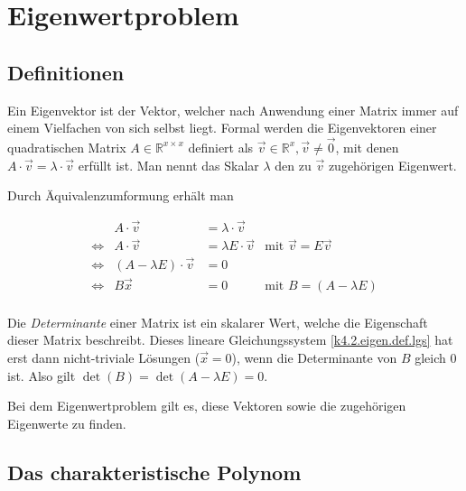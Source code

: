 \documentclass[]{dsadokumentation}
\begin{document}

\section{Eigenwertproblem}

\subsection{Definitionen}\label{k4.2.eigen.def}

Ein Eigenvektor ist der Vektor, welcher nach Anwendung einer Matrix immer auf einem Vielfachen von sich selbst liegt.
Formal werden die Eigenvektoren einer quadratischen Matrix $A \in \mathbb{R}^{x \times x}$ definiert als $\vec{v} \in \mathbb{R}^{x}, \vec{v} \neq \vec{0}$, mit denen $A \cdot \vec{v} = \lambda \cdot \vec{v}$ erfüllt ist. Man nennt das Skalar $\lambda$ den zu $\vec{v}$ zugehörigen Eigenwert.

Durch Äquivalenzumformung erhält man

\begin{equation}
  \label{k4.2.eigen.def.lgs}
  \begin{aligned}
    && A \cdot \vec{v} &= \lambda \cdot \vec{v} && \\
    &\Leftrightarrow& A \cdot \vec{v} &= \lambda E \cdot \vec{v} &\text{mit } \vec{v} = E\vec{v}& \\
    &\Leftrightarrow& (A - \lambda E) \cdot \vec{v} &= 0 && \\
    &\Leftrightarrow& B\vec{x} &= 0  \quad \quad &\text{mit } B = (A - \lambda E)&  \\
  \end{aligned}
\end{equation}

Die \textit{Determinante} einer Matrix ist ein skalarer Wert, welche die Eigenschaft dieser Matrix beschreibt. Dieses lineare Gleichungssystem \cref{k4.2.eigen.def.lgs} hat erst dann nicht-triviale Lösungen ($\vec{x} = 0$), wenn die Determinante von $B$ gleich $0$ ist. Also gilt $\det (B) = \det (A - \lambda E) = 0$.

Bei dem Eigenwertproblem gilt es, diese Vektoren sowie die zugehörigen Eigenwerte zu finden.


\subsection{Das charakteristische Polynom}
\end{document}
